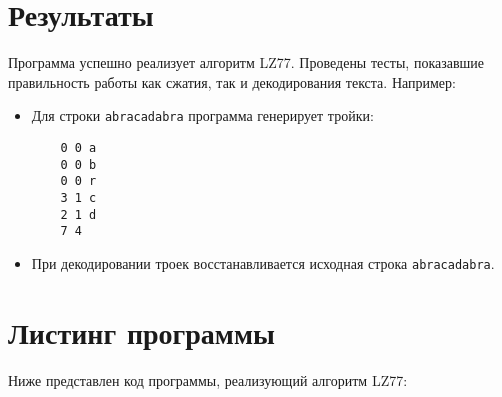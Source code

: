 \section*{Результаты}
Программа успешно реализует алгоритм LZ77. Проведены тесты, показавшие правильность работы как сжатия, так и декодирования текста. Например:
\begin{itemize}
    \item Для строки \texttt{abracadabra} программа генерирует тройки:
    \begin{verbatim}
    0 0 a
    0 0 b
    0 0 r
    3 1 c
    2 1 d
    7 4
    \end{verbatim}
    \item При декодировании троек восстанавливается исходная строка \texttt{abracadabra}.
\end{itemize}

\section*{Листинг программы}
Ниже представлен код программы, реализующий алгоритм LZ77:

